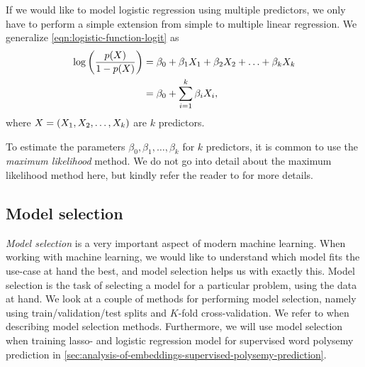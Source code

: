 If we would like to model logistic regression using multiple predictors, we only have to perform a simple extension from simple to multiple linear regression. We generalize \cref{eqn:logistic-function-logit} as
\begin{align}
    \log \left(\frac{p(X)}{1 - p(X)}\right)
    &= \beta_0 + \beta_1 X_1 + \beta_2 X_2 + \ldots + \beta_k X_k \label{eqn:logistic-function-logit-multiple} \\
    &= \beta_0 + \sum\limits_{i=1}^{k}{\beta_i X_i}, \notag
\end{align}
where $X = \left(X_1, X_2, \ldots, X_k\right)$ are $k$ predictors.

To estimate the parameters $\beta_0, \beta_1, \ldots, \beta_k$ for $k$ predictors, it is common to use the \textit{maximum likelihood} method. We do not go into detail about the maximum likelihood method here, but kindly refer the reader to \cite[p. 214]{fox2015applied} for more details.

\subsection{Model selection}
\label{sec:model-selection}
\textit{Model selection} is a very important aspect of modern machine learning. When working with machine learning, we would like to understand which model fits the use-case at hand the best, and model selection helps us with exactly this. Model selection is the task of selecting a model for a particular problem, using the data at hand. We look at a couple of methods for performing model selection, namely using train/validation/test splits and $K$-fold cross-validation. We refer to \cite{James2013} when describing model selection methods. Furthermore, we will use model selection when training lasso- and logistic regression model for supervised word polysemy prediction in \cref{sec:analysis-of-embeddings-supervised-polysemy-prediction}.

